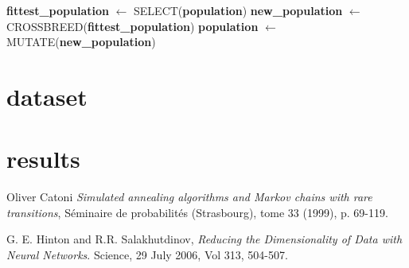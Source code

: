 \documentclass{article}
\begin{document}
\begin{algorithm}[H]
    \begin{algorithmic}[1]
        \State \textbf{fittest\_population} $\leftarrow$ SELECT(\textbf{population})
        \State \textbf{new\_population} $\leftarrow$ CROSSBREED(\textbf{fittest\_population})
       \State \textbf{population} $\leftarrow$ MUTATE(\textbf{new\_population})
       \EndFunction
\end{algorithmic}
\end{algorithm}
\section{dataset}

\section{results}

\begin{thebibliography}{9}

Oliver Catoni
\textit{Simulated annealing algorithms and Markov chains with rare transitions}, Séminaire de probabilités (Strasbourg), tome 33 (1999), p. 69-119.


G. E. Hinton and R.R. Salakhutdinov, 
\textit{Reducing the Dimensionality of Data with Neural Networks}. 
Science, 29 July 2006, Vol 313, 504-507.
 


\end{thebibliography}
\end{document}

